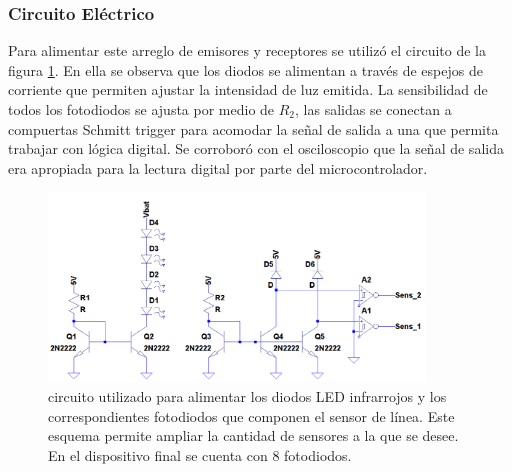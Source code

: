 \documentclass[10pt,conference,a4paper,onecolumn]{article}%
\begin{document}
\subsubsection{Circuito Eléctrico}
Para alimentar este arreglo de emisores y receptores se utilizó el circuito de la figura \ref{fig:circuitoSensorLinea}. En ella se observa que los diodos se alimentan a través de espejos de corriente que permiten ajustar la intensidad de luz emitida. La sensibilidad de todos los fotodiodos se ajusta por medio de $R_2$, las salidas se conectan a compuertas Schmitt trigger para acomodar la señal de salida a una que permita trabajar con lógica digital. Se corroboró con el osciloscopio que la señal de salida era apropiada para la lectura digital por parte del microcontrolador.
\begin{figure}[h]
	\centering
	\includegraphics[width=10cm]{./imagenes/circ_sens_lin.png}%
	\caption{circuito utilizado para alimentar los diodos LED infrarrojos y los correspondientes fotodiodos que componen el sensor de línea. Este esquema permite ampliar la cantidad de sensores a la que se desee. En el dispositivo final se cuenta con 8 fotodiodos. }
	\label{fig:circuitoSensorLinea}
\end{figure}
\end{document}
